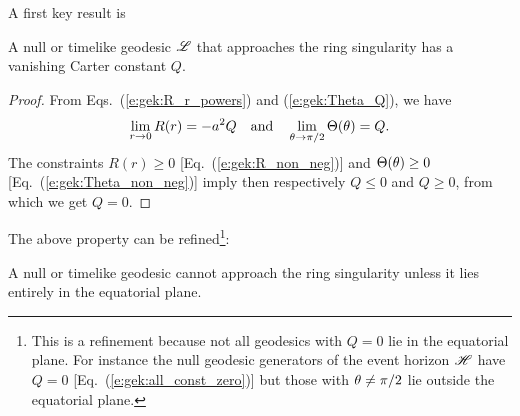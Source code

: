 A first key result is
\begin{greybox}
A null or timelike geodesic $\mathscr{L}$ that approaches the ring singularity has
a vanishing Carter constant $Q$.
\end{greybox}
\begin{proof}
From Eqs.~(\ref{e:gek:R_r_powers}) and (\ref{e:gek:Theta_Q}), we have
\[
 \lim_{r\to 0} R(r) = - a^2 Q \quad\mbox{and}\quad
 \lim_{\theta\to \pi/2} \Theta(\theta) = Q .
\]
The constraints $R(r) \geq 0$ [Eq.~(\ref{e:gek:R_non_neg})]
and $\Theta(\theta)\geq 0$ [Eq.~(\ref{e:gek:Theta_non_neg})] imply then respectively
$Q \leq 0$ and $Q\geq 0$, from which we get $Q=0$.
\end{proof}

The above property can be refined\footnote{This is a refinement because not all
geodesics with $Q=0$ lie in the equatorial plane. For instance the
null geodesic generators of the event horizon $\mathscr{H}$ have $Q=0$ [Eq.~(\ref{e:gek:all_const_zero})]
but those with $\theta\neq \pi/2$ lie outside the equatorial plane.}:
\begin{greybox}
A null or timelike geodesic cannot approach the ring singularity unless it lies
entirely in the equatorial plane.
\end{greybox}
